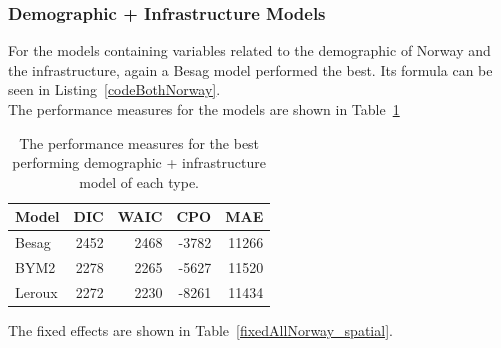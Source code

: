 \subsubsection{Demographic + Infrastructure Models}
For the models containing variables related to the demographic of Norway and the infrastructure, again a Besag model performed the best. Its formula can be seen in Listing~\ref{codeBothNorway}. \\
The performance measures for the models are shown in Table~\ref{allNorway}
\begin{table}[H] 
\caption{The performance measures for the best performing demographic + infrastructure model of each type. \label{allNorway}}
\begin{tabular}{l r r r r}
\toprule
\textbf{Model}	& \textbf{DIC}	& \textbf{WAIC} & \textbf{CPO} & \textbf{MAE} \\
\midrule
Besag  & 2452 & 2468 & -3782 & 11266 \\
BYM2 & 2278 & 2265 & -5627 & 11520\\
Leroux &  2272 & 2230 & -8261 & 11434\\
\bottomrule
\end{tabular}
\end{table}
The fixed effects are shown in Table~\ref{fixedAllNorway_spatial}.
